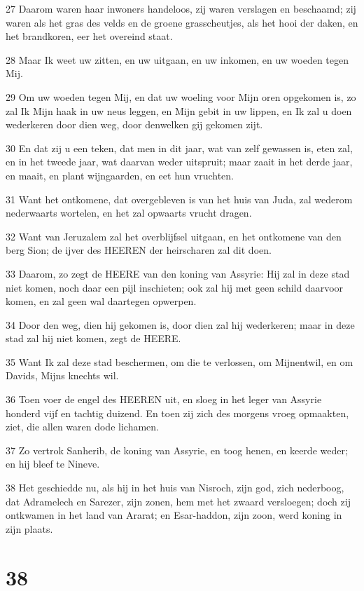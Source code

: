 \par 27 Daarom waren haar inwoners handeloos, zij waren verslagen en beschaamd; zij waren als het gras des velds en de groene grasscheutjes, als het hooi der daken, en het brandkoren, eer het overeind staat.
\par 28 Maar Ik weet uw zitten, en uw uitgaan, en uw inkomen, en uw woeden tegen Mij.
\par 29 Om uw woeden tegen Mij, en dat uw woeling voor Mijn oren opgekomen is, zo zal Ik Mijn haak in uw neus leggen, en Mijn gebit in uw lippen, en Ik zal u doen wederkeren door dien weg, door denwelken gij gekomen zijt.
\par 30 En dat zij u een teken, dat men in dit jaar, wat van zelf gewassen is, eten zal, en in het tweede jaar, wat daarvan weder uitspruit; maar zaait in het derde jaar, en maait, en plant wijngaarden, en eet hun vruchten.
\par 31 Want het ontkomene, dat overgebleven is van het huis van Juda, zal wederom nederwaarts wortelen, en het zal opwaarts vrucht dragen.
\par 32 Want van Jeruzalem zal het overblijfsel uitgaan, en het ontkomene van den berg Sion; de ijver des HEEREN der heirscharen zal dit doen.
\par 33 Daarom, zo zegt de HEERE van den koning van Assyrie: Hij zal in deze stad niet komen, noch daar een pijl inschieten; ook zal hij met geen schild daarvoor komen, en zal geen wal daartegen opwerpen.
\par 34 Door den weg, dien hij gekomen is, door dien zal hij wederkeren; maar in deze stad zal hij niet komen, zegt de HEERE.
\par 35 Want Ik zal deze stad beschermen, om die te verlossen, om Mijnentwil, en om Davids, Mijns knechts wil.
\par 36 Toen voer de engel des HEEREN uit, en sloeg in het leger van Assyrie honderd vijf en tachtig duizend. En toen zij zich des morgens vroeg opmaakten, ziet, die allen waren dode lichamen.
\par 37 Zo vertrok Sanherib, de koning van Assyrie, en toog henen, en keerde weder; en hij bleef te Nineve.
\par 38 Het geschiedde nu, als hij in het huis van Nisroch, zijn god, zich nederboog, dat Adramelech en Sarezer, zijn zonen, hem met het zwaard versloegen; doch zij ontkwamen in het land van Ararat; en Esar-haddon, zijn zoon, werd koning in zijn plaats.

\chapter{38}

